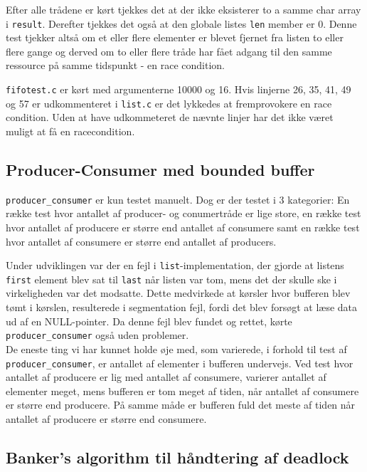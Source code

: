Efter alle trådene er kørt tjekkes det at der ikke eksisterer to a samme char array i \texttt{result}. Derefter tjekkes det også at den globale listes \texttt{len} member er 0. Denne test tjekker altså om et eller flere elementer er blevet fjernet fra listen to eller flere gange og derved om to eller flere tråde har fået adgang til den samme ressource på samme tidspunkt - en race condition.

\texttt{fifotest.c} er kørt med argumenterne 10000 og 16. Hvis linjerne 26, 35, 41, 49 og 57 er udkommenteret i \texttt{list.c} er det lykkedes at fremprovokere en race condition. Uden at have udkommeteret de nævnte linjer har det ikke været muligt at få en racecondition.

\subsection{Producer-Consumer med bounded buffer}
\texttt{producer\_consumer} er kun testet manuelt. Dog er der testet i 3 kategorier: En række test hvor antallet af producer- og conumertråde er lige store, en række test hvor antallet af producere er større end antallet af consumere samt en række test hvor antallet af consumere er større end antallet af producers.

Under udviklingen var der en fejl i \texttt{list}-implementation, der gjorde at listens \texttt{first} element blev sat til \texttt{last} når listen var tom, mens det der skulle ske i virkeligheden var det modsatte. Dette medvirkede at kørsler hvor bufferen blev tømt i kørslen, resulterede i segmentation fejl, fordi det blev forsøgt at læse data ud af en NULL-pointer. Da denne fejl blev fundet og rettet, kørte \texttt{producer\_consumer} også uden problemer.\\

De eneste ting vi har kunnet holde øje med, som varierede, i forhold til test af \texttt{producer\_consumer}, er antallet af elementer i bufferen undervejs. Ved test hvor antallet af producere er lig med antallet af consumere, varierer antallet af elementer meget, mens bufferen er tom meget af tiden, når antallet af consumere er større end producere. På samme måde er bufferen fuld det meste af tiden når antallet af producere er større end consumere.

\subsection{Banker's algorithm til håndtering af deadlock}
